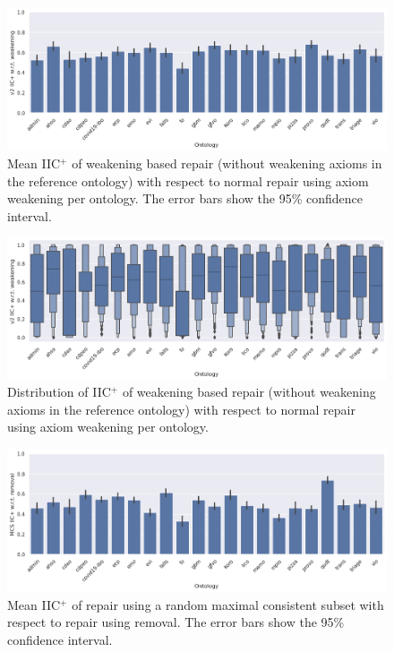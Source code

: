 \begin{figure}[ht]
  \centering
  \includegraphics[width=\textwidth]{resources/eiic-enhance-weaken-ontology-bar.png}
  \caption{Mean IIC$^+$ of weakening based repair (without weakening axioms in the reference ontology) with respect to normal repair using axiom weakening per ontology. The error bars show the 95\% confidence interval.}
\end{figure}

\begin{figure}[ht]
    \centering
    \includegraphics[width=\textwidth]{resources/eiic-enhance-weaken-ontology-violin.png}
    \caption{Distribution of IIC$^+$ of weakening based repair (without weakening axioms in the reference ontology) with respect to normal repair using axiom weakening per ontology.}
\end{figure}

\begin{figure}[ht]
  \centering
  \includegraphics[width=\textwidth]{resources/eiic-mcs-rem-ontology-bar.png}
  \caption{Mean IIC$^+$ of repair using a random maximal consistent subset with respect to repair using removal. The error bars show the 95\% confidence interval.}
\end{figure}

